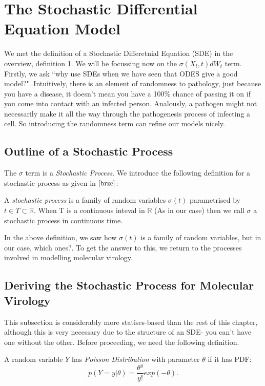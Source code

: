 \section{The Stochastic Differential Equation Model}
We met the definition of a Stochastic Differetnial Equation (SDE) in the overview, definition 1. We will be focussing now on the $\sigma(X_t,t)dW_t$ term. Firstly, we ask ``why use SDEs when we have seen that ODES give a good model?". Intuitively, there is an element of randomness to pathology, just because you have a disease, it doesn't mean you have a 100\% chance of passing it on if you come into contact with an infected person. Analously, a pathogen might not necessarily make it all the way through the pathogenesis process of infecting a cell. So introducing the randomness term can refine our models nicely.

\subsection{Outline of a Stochastic Process}
The $\sigma$ term is a  \textit{Stochastic Process}. We introduce the following definition for a stochastic process as given in $\cite{brze}$:

\begin{definition}
    A \textit{stochastic process} is a family of random variables $\sigma(t)$ parametrised by  $t \in T \subset \mathbb{R}$. When T is a continuous inteval in $\mathbb{R}$ (As in our case) then we call $\sigma$ a stochastic process in continuous time.
\end{definition}

In the above definition, we saw how $\sigma(t)$ is a family of random variables, but in our case, which ones?. To get the answer to this, we return to the processes involved in modelling molecular virology. 

\subsection{Deriving the Stochastic Process for Molecular Virology}

This subsection is considerably more statiscs-based than the rest of this chapter, although this is very necessary due to the structure of an SDE- you can't have one without the other. Before proceeding, we need the following definition.

\begin{definition}
    A random variable $Y$ has  \textit{Poisson Distribution} with parameter $\theta$ if it has PDF:
     \[
         p(Y=y | \theta) = \frac{\theta^y}{y!}exp(-\theta) 
    .\] 
\end{definition}

